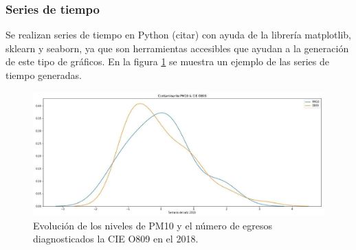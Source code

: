 \subsubsection{Series de tiempo}
Se realizan series de tiempo en Python (citar) con ayuda de la librería matplotlib, sklearn y seaborn, ya que son herramientas accesibles que ayudan a la generación de este tipo de gráficos. 
En la figura \ref{serie_de_tiempo} se muestra un ejemplo de las series de tiempo generadas.
\begin{figure}[h!]
\setcounter{figure}{0} %
\captionsetup{type=figure} %
\begin{center}
   \includegraphics[width=1.2\textwidth]{PM10_O809_2018.eps}
   \end{center}
    \caption{Evolución de los niveles de PM10 y el número de egresos diagnosticados la CIE O809 en el 2018.}
    \label{serie_de_tiempo}
\end{figure}

